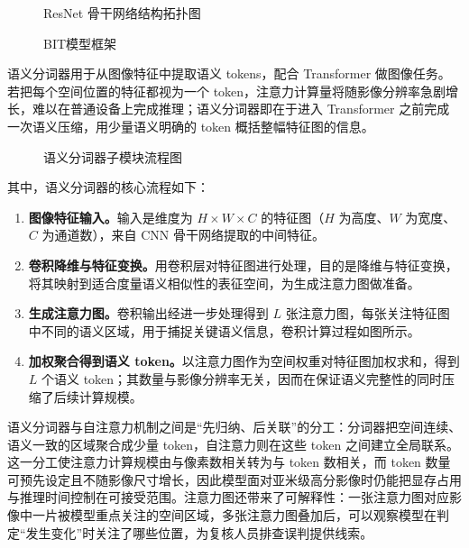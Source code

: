\documentclass[12pt, a4paper]{ctexart}
\begin{document}
\begin{figure}[htbp]
    \centering
    \caption{ResNet 骨干网络结构拓扑图}
    \label{fig:5}
\end{figure}

\begin{figure}[htbp]
    \centering
    \caption{BIT模型框架}
    \label{fig:6}
\end{figure}

语义分词器用于从图像特征中提取语义 tokens，配合 Transformer 做图像任务。若把每个空间位置的特征都视为一个 token，注意力计算量将随影像分辨率急剧增长，难以在普通设备上完成推理；语义分词器即在于进入 Transformer 之前完成一次语义压缩，用少量语义明确的 token 概括整幅特征图的信息。

\begin{figure}[htbp]
    \centering
    \caption{语义分词器子模块流程图}
    \label{fig:7}
\end{figure}

其中，语义分词器的核心流程如下：

\begin{enumerate}
    \item \textbf{图像特征输入。}输入是维度为 $H \times W \times C$ 的特征图（$H$ 为高度、$W$ 为宽度、$C$ 为通道数），来自 CNN 骨干网络提取的中间特征。
    \item \textbf{卷积降维与特征变换。}用卷积层对特征图进行处理，目的是降维与特征变换，将其映射到适合度量语义相似性的表征空间，为生成注意力图做准备。
    \item \textbf{生成注意力图。}卷积输出经进一步处理得到 $L$ 张注意力图，每张关注特征图中不同的语义区域，用于捕捉关键语义信息，卷积计算过程如图所示。
    \item \textbf{加权聚合得到语义 token。}以注意力图作为空间权重对特征图加权求和，得到 $L$ 个语义 token；其数量与影像分辨率无关，因而在保证语义完整性的同时压缩了后续计算规模。
\end{enumerate}

语义分词器与自注意力机制之间是“先归纳、后关联”的分工：分词器把空间连续、语义一致的区域聚合成少量 token，自注意力则在这些 token 之间建立全局联系。这一分工使注意力计算规模由与像素数相关转为与 token 数相关，而 token 数量可预先设定且不随影像尺寸增长，因此模型面对亚米级高分影像时仍能把显存占用与推理时间控制在可接受范围。注意力图还带来了可解释性：一张注意力图对应影像中一片被模型重点关注的空间区域，多张注意力图叠加后，可以观察模型在判定“发生变化”时关注了哪些位置，为复核人员排查误判提供线索。
\end{document}
